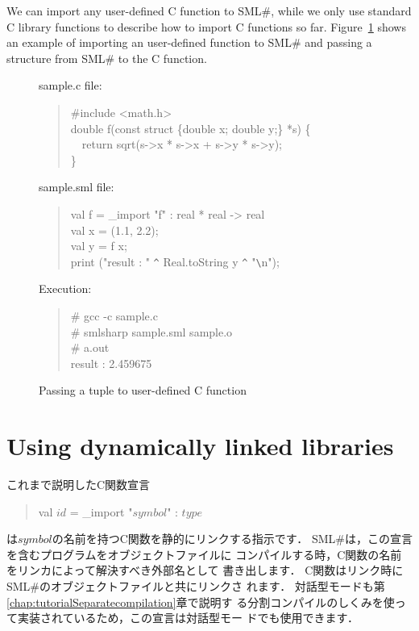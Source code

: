 \documentclass{jbook}
\newcommand{\txt}[2]{#2}
\newcommand{\smlsharp}{SML\#}
\newcommand{\myem}{\mbox{\ \ }}
\newenvironment{program}{\begin{quote}\begin{tt}}%
                        {\end{tt}\end{quote}}
\begin{document}
	We can import any user-defined C function to \smlsharp{},
while we only use standard C library functions to describe how to
import C functions so far.
	Figure~\ref{fig:sampleStruct} shows an example of importing
an user-defined function to \smlsharp{} and passing a structure from
\smlsharp{} to the C function.

\begin{figure}
\begin{center}
\begin{minipage}{0.9\textwidth}
sample.c file:
\begin{program}
\#include <math.h>\\
double f(const struct \{double x; double y;\} *s) \{\\
\myem  return sqrt(s->x * s->x + s->y * s->y);\\
\}
\end{program}
sample.sml file:
\begin{program}
val f = \_import "f" : real * real -> real\\
val x = (1.1, 2.2);\\
val y = f x;\\
print ("result : " \verb|^| Real.toString y \verb|^| "\verb|\|n");\\
\end{program}
Execution:
\begin{program}
\# gcc -c sample.c\\
\# smlsharp sample.sml sample.o\\
\# a.out\\
result : 2.459675\\
\end{program}
\end{minipage}
\end{center}
\caption{Passing a tuple to user-defined C function}
\label{fig:sampleStruct}
\end{figure}

\fi%


\section{\txt{動的リンクライブラリの使用}{Using dynamically linked libraries}}
\label{sec:tutorialDynamiclinc}

\ifjp%
	これまで説明したC関数宣言
\begin{program}
val $\mathit{id}$ = \_import "$\mathit{symbol}$" : $\mathit{type}$
\end{program}
は$\mathit{symbol}$の名前を持つC関数を静的にリンクする指示です．
	\smlsharp{}は，この宣言を含むプログラムをオブジェクトファイルに
コンパイルする時，C関数の名前をリンカによって解決すべき外部名として
書き出します．
	C関数はリンク時に\smlsharp{}のオブジェクトファイルと共にリンクさ
れます．
	対話型モードも第\ref{chap:tutorialSeparatecompilation}章で説明す
る分割コンパイルのしくみを使って実装されているため，この宣言は対話型モー
ドでも使用できます．
\end{document}
